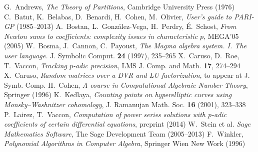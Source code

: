 \documentclass{article}
\begin{document}
\begin{thebibliography}{99}
{}
  G.~Andrews,
  \emph{The Theory of Partitions},
  Cambridge University Press (1976)
  C.~Batut, K.~Belabas, D.~Benardi, H.~Cohen, M.~Olivier, 
  \emph{User’s guide to PARI-GP} (1985--2013)
  A.~Bostan, L.~Gonz\'alez-Vega, H.~Perdry, É.~Schost, 
  \emph{From Newton sums to coefficients: complexity issues in characteristic $p$}, 
  MEGA’05 (2005)
  W.~Bosma, J.~Cannon, C.~Payoust, 
  \emph{The Magma algebra system. I. The user language.}
  J. Symbolic Comput. {\bf 24} (1997), 235--265
  X.~Caruso, D.~Roe, T.~Vaccon,
  \emph{Tracking $p$-adic precision},
  LMS J. Comp. and Math. {\bf 17}, 274--294
  X.~Caruso,
  \emph{Random matrices over a DVR and LU factorization},
  to appear at J. Symb. Comp.
  H.~Cohen,
  \emph{A course in Computational Algebraic Number Theory},
  Springer (1996)
  K.~Kedlaya,
  \emph{Counting points on hyperelliptic curves using Monsky--Washnitzer cohomology}, 
  J. Ramanujan Math. Soc. {\bf 16} (2001), 323--338
  P.~Lairez, T.~Vaccon,
  \emph{Computation of power series solutions with $p$-adic coefficients of certain differential equations},
  preprint (2014)
  W.~Stein et al.
  \emph{Sage Mathematics Software}, 
  The Sage Development Team (2005--2013)
  F.~Winkler,
  \emph{Polynomial Algorithms in Computer Algebra},
  Springer Wien New Work (1996)
\bibitem{}
\end{thebibliography}
\end{document}
